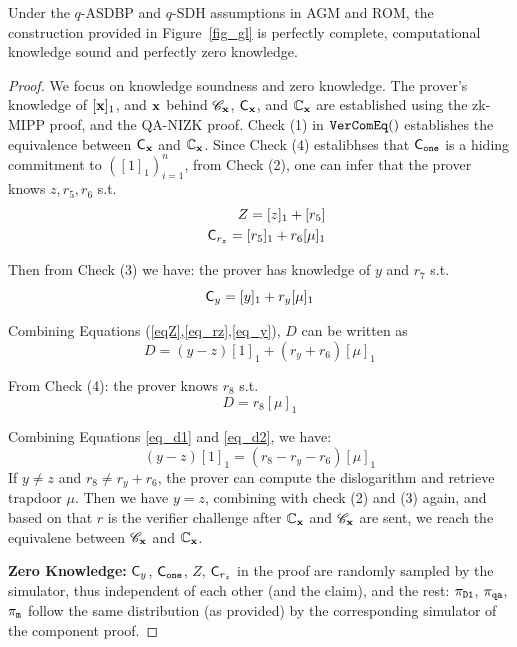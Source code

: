 \begin{lemma}\label{lemma_comeq} Under the $q$-ASDBP and 
$q$-SDH assumptions \cite{Bunz21} in AGM and ROM, the construction provided in 
Figure\ \ref{fig_gl} is perfectly complete, computational knowledge
sound and perfectly zero knowledge.
\end{lemma}
\begin{proof} We focus on knowledge soundness and zero knowledge.
The prover's knowledge of $[{{\mathbf {x}}}]_1$, and ${{\mathbf {x}}}$ behind 
${\mathscr{C}}_{{\mathbf {x}}}$, ${\mathsf{C}}_{{{\mathbf {x}}}}$, and ${\mathbb{C}}_{{{\mathbf {x}}}}$
are established using the zk-MIPP proof, and the QA-NIZK proof.
Check (1) in ${\texttt{VerComEq}}()$
establishes the equivalence between ${\mathsf{C}}_{{{\mathbf {x}}}}$
and ${\mathbb{C}}_{{{\mathbf {x}}}}$. Since Check (4) estalibhses that
${\mathsf{C}}_{{\tt one}}$ is a hiding commitment to $([1]_1)_{i=1}^n$,
from Check (2), one can infer that the prover knows
$z, r_5, r_6$ s.t.
\begin{eqnarray}
 & & Z = [z]_1 + [r_5] \label{eqZ} \\
 & & {\mathsf{C}}_{r_z} = [r_5]_1 + r_6 [\mu]_1 \label{eq_rz}
\end{eqnarray}

Then from Check (3) we have: the prover has knowledge of
$y$ and $r_7$ s.t.
\begin{equation} \label{eq_y}
{\mathsf{C}}_y = [y]_1 + r_y[\mu]_1
\end{equation}

Combining Equations (\ref{eqZ},\ref{eq_rz},\ref{eq_y}), $D$ can be written as
\begin{equation} \label{eq_d1}
D = (y-z)[1]_1 + (r_y + r_6) [\mu]_1
\end{equation}

From Check (4): the prover knows $r_8$ s.t.
\begin{equation} \label{eq_d2}
D = r_8 [\mu]_1
\end{equation}

Combining Equations \ref{eq_d1} and \ref{eq_d2}, we have:
\[
	(y-z)[1]_1 = (r_8-r_y-r_6) [\mu]_1
\]
If $y\neq z$ and $r_8\neq r_y + r_6$, the prover can compute
the dislogarithm and retrieve trapdoor $\mu$. Then we have
$y=z$, combining with check (2) and (3) again, and based 
on that $r$ is the verifier challenge after ${\mathbb{C}}_{{{\mathbf {x}}}}$
and ${\mathscr{C}}_{{{\mathbf {x}}}}$ are sent, we reach
the equivalene between
${\mathscr{C}}_{{{\mathbf {x}}}}$ and ${\mathbb{C}}_{{{\mathbf {x}}}}$.

{\bf Zero Knowledge:} ${\mathsf{C}}_y$,
${\mathsf{C}}_{{\tt one}}$, $Z$, ${\mathsf{C}}_{r_z}$ in the proof are
randomly sampled by the simulator, thus 
independent of each other (and the claim), and the rest:
$\pi_{{\tt D1}}$, $\pi_{{\tt qa}}$, $\pi_{{\tt m}}$
follow the same distribution (as provided) by the corresponding
simulator of the component proof.


\end{proof}

